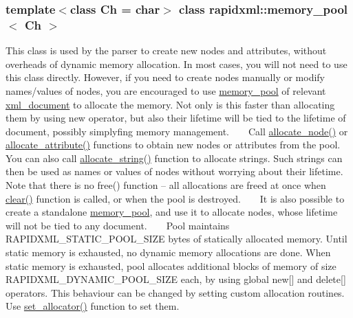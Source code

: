 \subsubsection*{template$<$class Ch = char$>$\newline
class rapidxml\+::memory\+\_\+pool$<$ Ch $>$}

This class is used by the parser to create new nodes and attributes, without overheads of dynamic memory allocation. In most cases, you will not need to use this class directly. However, if you need to create nodes manually or modify names/values of nodes, you are encouraged to use \mbox{\hyperlink{classrapidxml_1_1memory__pool}{memory\+\_\+pool}} of relevant \mbox{\hyperlink{classrapidxml_1_1xml__document}{xml\+\_\+document}} to allocate the memory. Not only is this faster than allocating them by using {\ttfamily new} operator, but also their lifetime will be tied to the lifetime of document, possibly simplyfing memory management. ~\newline
~\newline
 Call \mbox{\hyperlink{classrapidxml_1_1memory__pool_a4118581c29ee9a2f6b55ebf7dac185f8}{allocate\+\_\+node()}} or \mbox{\hyperlink{classrapidxml_1_1memory__pool_a3de2a66c983336e006ea3844e244ed30}{allocate\+\_\+attribute()}} functions to obtain new nodes or attributes from the pool. You can also call \mbox{\hyperlink{classrapidxml_1_1memory__pool_a171941b39d55b868358da97462185f58}{allocate\+\_\+string()}} function to allocate strings. Such strings can then be used as names or values of nodes without worrying about their lifetime. Note that there is no {\ttfamily free()} function -- all allocations are freed at once when \mbox{\hyperlink{classrapidxml_1_1memory__pool_aad377c835fdaed1cb2cc9df194cf84e4}{clear()}} function is called, or when the pool is destroyed. ~\newline
~\newline
 It is also possible to create a standalone \mbox{\hyperlink{classrapidxml_1_1memory__pool}{memory\+\_\+pool}}, and use it to allocate nodes, whose lifetime will not be tied to any document. ~\newline
~\newline
 Pool maintains {\ttfamily R\+A\+P\+I\+D\+X\+M\+L\+\_\+\+S\+T\+A\+T\+I\+C\+\_\+\+P\+O\+O\+L\+\_\+\+S\+I\+ZE} bytes of statically allocated memory. Until static memory is exhausted, no dynamic memory allocations are done. When static memory is exhausted, pool allocates additional blocks of memory of size {\ttfamily R\+A\+P\+I\+D\+X\+M\+L\+\_\+\+D\+Y\+N\+A\+M\+I\+C\+\_\+\+P\+O\+O\+L\+\_\+\+S\+I\+ZE} each, by using global {\ttfamily new\mbox{[}\mbox{]}} and {\ttfamily delete\mbox{[}\mbox{]}} operators. This behaviour can be changed by setting custom allocation routines. Use \mbox{\hyperlink{classrapidxml_1_1memory__pool_a84d3d8d2cdfc00501e1dcf26d889ae03}{set\+\_\+allocator()}} function to set them. ~\newline
